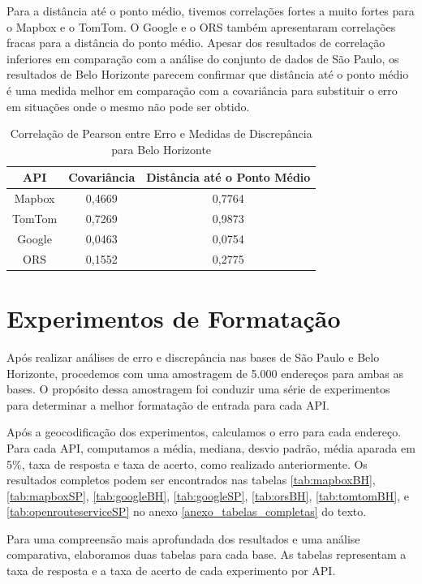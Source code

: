 Para a distância até o ponto médio, tivemos correlações fortes a muito fortes para o Mapbox e o TomTom. O Google e o ORS também apresentaram correlações fracas para a distância do ponto médio. Apesar dos resultados de correlação inferiores em comparação com a análise do conjunto de dados de São Paulo, os resultados de Belo Horizonte parecem confirmar que distância até o ponto médio é uma medida melhor em comparação com a covariância para substituir o erro em situações onde o mesmo não pode ser obtido.

\begin{table}[!ht]
\centering
\caption{Correlação de Pearson entre Erro e Medidas de Discrepância para Belo Horizonte}
\label{tab:correlationBH}
\begin{adjustbox}{width=0.7\textwidth}
\begin{tabular}{|c|c|c|}
\hline
API & Covariância & Distância até o Ponto Médio \\
\hline
Mapbox & 0,4669 & 0,7764 \\
TomTom & 0,7269 & 0,9873 \\
Google & 0,0463 & 0,0754 \\
ORS & 0,1552 & 0,2775 \\
\hline
\end{tabular}
\end{adjustbox}
\end{table}

\section{Experimentos de Formatação}

Após realizar análises de erro e discrepância nas bases de São Paulo e Belo Horizonte, procedemos com uma amostragem de 5.000 endereços para ambas as bases. O propósito dessa amostragem foi conduzir uma série de experimentos para determinar a melhor formatação de entrada para cada API.

Após a geocodificação dos experimentos, calculamos o erro para cada endereço. Para cada API, computamos a média, mediana, desvio padrão, média aparada em 5\%, taxa de resposta e taxa de acerto, como realizado anteriormente. Os resultados completos podem ser encontrados nas tabelas \ref{tab:mapboxBH}, \ref{tab:mapboxSP}, \ref{tab:googleBH}, \ref{tab:googleSP}, \ref{tab:orsBH}, \ref{tab:tomtomBH}, e \ref{tab:openrouteserviceSP} no anexo \ref{anexo_tabelas_completas} do texto.

Para uma compreensão mais aprofundada dos resultados e uma análise comparativa, elaboramos duas tabelas para cada base. As tabelas representam a taxa de resposta e a taxa de acerto de cada experimento por API.

